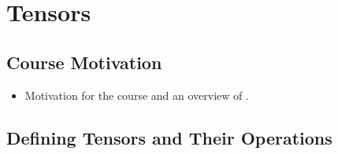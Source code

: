 \documentclass[../notes.tex]{subfiles}
\begin{document}
\chapter{Tensors}
\section{Course Motivation}
\begin{itemize}
    \item {}Motivation for the course and an overview of \textcite{bib:DifferentialForms}.
\end{itemize}



\section{Defining Tensors and Their Operations}
\end{document}
